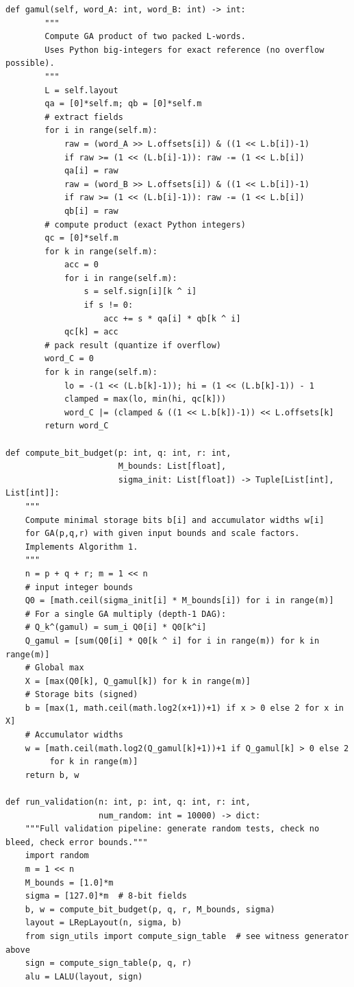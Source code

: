 \documentclass[11pt,a4paper]{article}
\theoremstyle{definition}
\theoremstyle{plain}
\theoremstyle{remark}
\begin{document}
\begin{lstlisting}[caption={Complete Python reference model for L-Rep validation},label=lst:python]
    def gamul(self, word_A: int, word_B: int) -> int:
        """
        Compute GA product of two packed L-words.
        Uses Python big-integers for exact reference (no overflow possible).
        """
        L = self.layout
        qa = [0]*self.m; qb = [0]*self.m
        # extract fields
        for i in range(self.m):
            raw = (word_A >> L.offsets[i]) & ((1 << L.b[i])-1)
            if raw >= (1 << (L.b[i]-1)): raw -= (1 << L.b[i])
            qa[i] = raw
            raw = (word_B >> L.offsets[i]) & ((1 << L.b[i])-1)
            if raw >= (1 << (L.b[i]-1)): raw -= (1 << L.b[i])
            qb[i] = raw
        # compute product (exact Python integers)
        qc = [0]*self.m
        for k in range(self.m):
            acc = 0
            for i in range(self.m):
                s = self.sign[i][k ^ i]
                if s != 0:
                    acc += s * qa[i] * qb[k ^ i]
            qc[k] = acc
        # pack result (quantize if overflow)
        word_C = 0
        for k in range(self.m):
            lo = -(1 << (L.b[k]-1)); hi = (1 << (L.b[k]-1)) - 1
            clamped = max(lo, min(hi, qc[k]))
            word_C |= (clamped & ((1 << L.b[k])-1)) << L.offsets[k]
        return word_C

def compute_bit_budget(p: int, q: int, r: int,
                       M_bounds: List[float], 
                       sigma_init: List[float]) -> Tuple[List[int], List[int]]:
    """
    Compute minimal storage bits b[i] and accumulator widths w[i]
    for GA(p,q,r) with given input bounds and scale factors.
    Implements Algorithm 1.
    """
    n = p + q + r; m = 1 << n
    # input integer bounds
    Q0 = [math.ceil(sigma_init[i] * M_bounds[i]) for i in range(m)]
    # For a single GA multiply (depth-1 DAG):
    # Q_k^(gamul) = sum_i Q0[i] * Q0[k^i]
    Q_gamul = [sum(Q0[i] * Q0[k ^ i] for i in range(m)) for k in range(m)]
    # Global max
    X = [max(Q0[k], Q_gamul[k]) for k in range(m)]
    # Storage bits (signed)
    b = [max(1, math.ceil(math.log2(x+1))+1) if x > 0 else 2 for x in X]
    # Accumulator widths
    w = [math.ceil(math.log2(Q_gamul[k]+1))+1 if Q_gamul[k] > 0 else 2
         for k in range(m)]
    return b, w

def run_validation(n: int, p: int, q: int, r: int,
                   num_random: int = 10000) -> dict:
    """Full validation pipeline: generate random tests, check no bleed, check error bounds."""
    import random
    m = 1 << n
    M_bounds = [1.0]*m
    sigma = [127.0]*m  # 8-bit fields
    b, w = compute_bit_budget(p, q, r, M_bounds, sigma)
    layout = LRepLayout(n, sigma, b)
    from sign_utils import compute_sign_table  # see witness generator above
    sign = compute_sign_table(p, q, r)
    alu = LALU(layout, sign)
    

\end{lstlisting}
\end{document}
